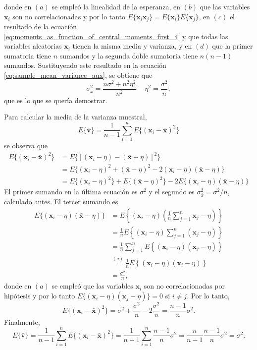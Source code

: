 \documentclass[a4paper]{report}
\newcommand{\x}{\mathbf{x}}
\begin{document}
donde en \((a)\) se empleó la linealidad de la esperanza, en \((b)\) que las variables \(\x_i\) son no correlacionadas y por lo tanto \(E\{\x_i\x_j\}=E\{\x_i\}E\{\x_j\}\), en \((c)\) el resultado de la ecuación \ref{eq:moments_as_function_of_central_moments_first_4} y que todas las variables aleatorias \(\x_i\) tienen la misma media y varianza, y en \((d)\)  que la primer sumatoria tiene \(n\) sumandos y la segunda doble sumatoria tiene \(n(n-1)\) sumandos. Sustituyendo este resultado en la ecuación \ref{eq:sample_mean_variance_aux}, se obtiene que
\[
 \sigma_{\bar{x}}^2=\frac{n\sigma^2+n^2\eta^2}{n^2}-\eta^2=\frac{\sigma^2}{n},
\]
que es lo que se quería demostrar.

Para calcular la media de la varianza muestral, 
\[
 E\{\bar{\mathbf{v}}\}=\frac{1}{n-1}\sum_{i=1}^{n}E\{(\x_i-\bar{\x})^2\}
\]
se observa que
\begin{align*}
 E\{(\x_i-\bar{\x})^2\}&=E\{[(\x_i-\eta)-(\bar{\x}-\eta)]^2\}\\
  &=E\{(\x_i-\eta)^2+(\bar{\x}-\eta)^2-2(\x_i-\eta)(\bar{\x}-\eta)\}\\
  &=E\{(\x_i-\eta)^2\}+E\{(\bar{\x}-\eta)^2\}-2E\{(\x_i-\eta)(\bar{\x}-\eta)\}
\end{align*}
El primer sumando en la última ecuación es \(\sigma^2\) y el segundo es \(\sigma^2_{\bar{x}}=\sigma^2/n\), calculado antes. El tercer sumando es
\begin{align*}
 E\{(\x_i-\eta)(\bar{\x}-\eta)\}&=E\left\{(\x_i-\eta)\left(\frac{1}{n}\sum_{j=1}^{n}\x_j-\eta\right)\right\}\\
   &=\frac{1}{n}E\left\{(\x_i-\eta)\sum_{j=1}^{n}\left(\x_j-\eta\right)\right\}\\
   &=\frac{1}{n}\sum_{j=1}^{n}E\left\{(\x_i-\eta)\left(\x_j-\eta\right)\right\}\\
   &\overset{(a)}{=}\frac{1}{n}E\left\{(\x_i-\eta)\left(\x_i-\eta\right)\right\}\\
   &=\frac{\sigma^2}{n},
\end{align*}
donde en \((a)\) se empleó que las variables \(\x_i\) son no correlacionadas por hipótesis y por lo tanto \(E\{(\x_i-\eta)(\x_j-\eta)\}=0\) si \(i\neq j\).
Por lo tanto,
\[
 E\{(\x_i-\bar{\x})^2\}=\sigma^2+\frac{\sigma^2}{n}-2\frac{\sigma^2}{n}=\frac{n-1}{n}\sigma^2.
\]
Finalmente,
\[
 E\{\bar{\mathbf{v}}\}=\frac{1}{n-1}\sum_{i=1}^{n}E\{(\x_i-\bar{\x})^2\}=\frac{1}{n-1}\sum_{i=1}^{n}\frac{n-1}{n}\sigma^2=\frac{n}{n-1}\frac{n-1}{n}\sigma^2=\sigma^2.
\]
\end{document}
